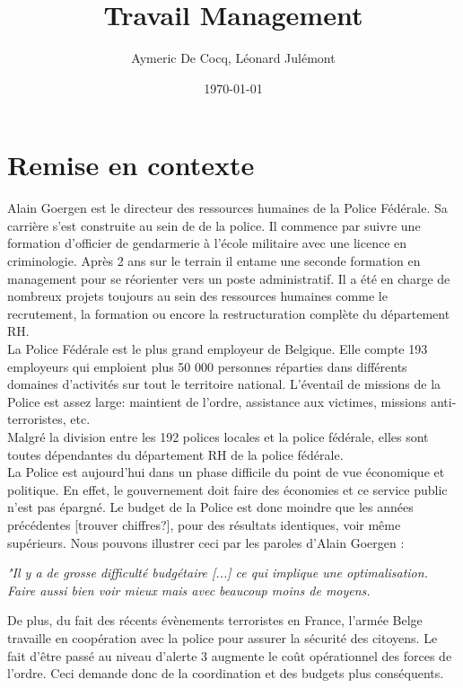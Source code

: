 \documentclass[12pt]{article}
\title{Travail Management}
\author{Aymeric De Cocq, Léonard Julémont}
\date{\today}
\begin{document}
\maketitle

\section{Remise en contexte}


Alain Goergen est le directeur des ressources humaines de la Police Fédérale. Sa carrière s'est construite au sein de de la police. Il commence par suivre une formation d'officier de gendarmerie à l'école militaire avec une licence en criminologie. Après 2 ans sur le terrain il entame une seconde formation en management pour se réorienter vers un poste administratif. Il a été en charge de nombreux projets toujours au sein des ressources humaines comme le recrutement, la formation ou encore la restructuration complète du département RH.\\

La Police Fédérale est le plus grand employeur de Belgique. Elle compte 193 employeurs qui emploient plus 50 000 personnes réparties dans différents domaines d'activités sur tout le territoire national. L'éventail de missions de la Police est assez large: maintient de l'ordre, assistance aux victimes, missions anti-terroristes, etc.\\

Malgré la division entre les 192 polices locales et la police fédérale, elles sont toutes dépendantes du département RH de la police fédérale.\\
 
La Police est aujourd'hui dans un phase difficile du point de vue économique et politique. En effet, le gouvernement doit faire des économies et ce service public n'est pas épargné. Le budget de la Police est donc moindre que les années précédentes [trouver chiffres?], pour des résultats identiques, voir même supérieurs. Nous pouvons illustrer ceci par les paroles d'Alain Goergen : 

\begin{center}
	\textit{"Il y a de grosse difficulté budgétaire [...] ce qui implique une optimalisation. Faire aussi bien voir mieux mais avec beaucoup moins de moyens.}
\end{center} 

De plus, du fait des récents évènements terroristes en France, l'armée Belge travaille en coopération avec la police pour assurer la sécurité des citoyens. Le fait d'être passé au niveau d'alerte 3 augmente le coût opérationnel des forces de l'ordre. Ceci demande donc de la coordination et des budgets plus conséquents.
\end{document}
